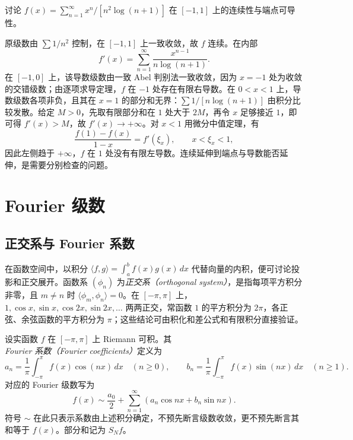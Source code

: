 \begin{example}
\label{ex:pei-power-endpoint-derivative}
讨论 $f(x)=\sum_{n=1}^{\infty}x^n/[n^2\log(n+1)]$ 在 $[-1,1]$ 上的连续性与端点可导性。
\end{example}
\begin{solve}
原级数由 $\sum1/n^2$ 控制，在 $[-1,1]$ 上一致收敛，故 $f$ 连续。在内部
\[
 f'(x)=\sum_{n=1}^{\infty}\frac{x^{n-1}}{n\log(n+1)}.
\]
在 $[-1,0]$ 上，该导数级数由一致 Abel 判别法一致收敛，因为 $x=-1$ 处为收敛的交错级数；由逐项求导定理，$f$ 在 $-1$ 处存在有限右导数。在 $0<x<1$ 上，导数级数各项非负，且其在 $x=1$ 的部分和无界：$\sum1/[n\log(n+1)]$ 由积分比较发散。给定 $M>0$，先取有限部分和在 $1$ 处大于 $2M$，再令 $x$ 足够接近 $1$，即可得 $f'(x)>M$，故 $f'(x)\to+\infty$。对 $x<1$ 用微分中值定理，有
\[
 \frac{f(1)-f(x)}{1-x}=f'(\xi_x),\qquad x<\xi_x<1,
\]
因此左侧趋于 $+\infty$，$f$ 在 $1$ 处没有有限左导数。连续延伸到端点与导数能否延伸，是需要分别检查的问题。
\end{solve}

\section{Fourier 级数}
\label{sec:pei-fourier-series}

\subsection{正交系与 Fourier 系数}

在函数空间中，以积分 $\langle f,g\rangle=\int_a^bf(x)g(x)\,dx$ 代替向量的内积，便可讨论投影和正交展开。函数系 $(\phi_n)$ 为\emph{正交系（orthogonal system）}，是指每项平方积分非零，且 $m\ne n$ 时 $\langle\phi_m,\phi_n\rangle=0$。在 $[-\pi,\pi]$ 上，$1,\cos x,\sin x,\cos2x,\sin2x,\ldots$ 两两正交，常函数 $1$ 的平方积分为 $2\pi$，各正弦、余弦函数的平方积分为 $\pi$；这些结论可由积化和差公式和有限积分直接验证。

\begin{definition}
设实函数 $f$ 在 $[-\pi,\pi]$ 上 Riemann 可积。其\emph{Fourier 系数（Fourier coefficients）}定义为
\[
 a_n=\frac1\pi\int_{-\pi}^{\pi}f(x)\cos(nx)\,dx\quad(n\geq0),\qquad
 b_n=\frac1\pi\int_{-\pi}^{\pi}f(x)\sin(nx)\,dx\quad(n\geq1).
\]
对应的 Fourier 级数写为
\[
 f(x)\sim\frac{a_0}{2}+\sum_{n=1}^{\infty}(a_n\cos nx+b_n\sin nx).
\]
符号 $\sim$ 在此只表示系数由上述积分确定，不预先断言级数收敛，更不预先断言其和等于 $f(x)$。部分和记为 $S_Nf$。
\end{definition}


